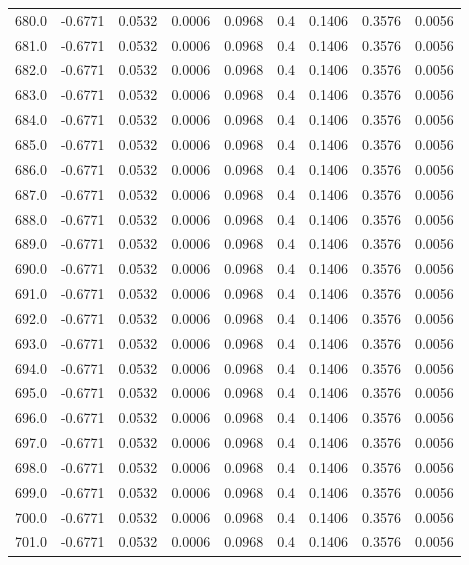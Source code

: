 \begin{longtable}{lrrrrrrrr}
680.0 & -0.6771 & 0.0532 & 0.0006 & 0.0968 & 0.4 & 0.1406 & 0.3576 & 0.0056 \\
681.0 & -0.6771 & 0.0532 & 0.0006 & 0.0968 & 0.4 & 0.1406 & 0.3576 & 0.0056 \\
682.0 & -0.6771 & 0.0532 & 0.0006 & 0.0968 & 0.4 & 0.1406 & 0.3576 & 0.0056 \\
683.0 & -0.6771 & 0.0532 & 0.0006 & 0.0968 & 0.4 & 0.1406 & 0.3576 & 0.0056 \\
684.0 & -0.6771 & 0.0532 & 0.0006 & 0.0968 & 0.4 & 0.1406 & 0.3576 & 0.0056 \\
685.0 & -0.6771 & 0.0532 & 0.0006 & 0.0968 & 0.4 & 0.1406 & 0.3576 & 0.0056 \\
686.0 & -0.6771 & 0.0532 & 0.0006 & 0.0968 & 0.4 & 0.1406 & 0.3576 & 0.0056 \\
687.0 & -0.6771 & 0.0532 & 0.0006 & 0.0968 & 0.4 & 0.1406 & 0.3576 & 0.0056 \\
688.0 & -0.6771 & 0.0532 & 0.0006 & 0.0968 & 0.4 & 0.1406 & 0.3576 & 0.0056 \\
689.0 & -0.6771 & 0.0532 & 0.0006 & 0.0968 & 0.4 & 0.1406 & 0.3576 & 0.0056 \\
690.0 & -0.6771 & 0.0532 & 0.0006 & 0.0968 & 0.4 & 0.1406 & 0.3576 & 0.0056 \\
691.0 & -0.6771 & 0.0532 & 0.0006 & 0.0968 & 0.4 & 0.1406 & 0.3576 & 0.0056 \\
692.0 & -0.6771 & 0.0532 & 0.0006 & 0.0968 & 0.4 & 0.1406 & 0.3576 & 0.0056 \\
693.0 & -0.6771 & 0.0532 & 0.0006 & 0.0968 & 0.4 & 0.1406 & 0.3576 & 0.0056 \\
694.0 & -0.6771 & 0.0532 & 0.0006 & 0.0968 & 0.4 & 0.1406 & 0.3576 & 0.0056 \\
695.0 & -0.6771 & 0.0532 & 0.0006 & 0.0968 & 0.4 & 0.1406 & 0.3576 & 0.0056 \\
696.0 & -0.6771 & 0.0532 & 0.0006 & 0.0968 & 0.4 & 0.1406 & 0.3576 & 0.0056 \\
697.0 & -0.6771 & 0.0532 & 0.0006 & 0.0968 & 0.4 & 0.1406 & 0.3576 & 0.0056 \\
698.0 & -0.6771 & 0.0532 & 0.0006 & 0.0968 & 0.4 & 0.1406 & 0.3576 & 0.0056 \\
699.0 & -0.6771 & 0.0532 & 0.0006 & 0.0968 & 0.4 & 0.1406 & 0.3576 & 0.0056 \\
700.0 & -0.6771 & 0.0532 & 0.0006 & 0.0968 & 0.4 & 0.1406 & 0.3576 & 0.0056 \\
701.0 & -0.6771 & 0.0532 & 0.0006 & 0.0968 & 0.4 & 0.1406 & 0.3576 & 0.0056 \\

\end{longtable}
